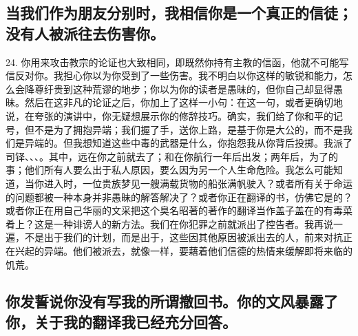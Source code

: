 \subsection{当我们作为朋友分别时，我相信你是一个真正的信徒；没有人被派往去伤害你。}

24. 你用来攻击教宗的论证也大致相同，即既然你持有主教的信函，他就不可能写信反对你。我担心你以为你受到了一些伤害。我不明白以你这样的敏锐和能力，怎么会降尊纡贵到这种荒谬的地步；你以为你的读者是愚昧的，但你自己却显得愚昧。然后在这非凡的论证之后，你加上了这样一小句：在这一句，或者更确切地说，在夸张的演讲中，你无疑想展示你的修辞技巧。确实，我们给了你和平的记号，但不是为了拥抱异端；我们握了手，送你上路，是基于你是大公的，而不是我们是异端的。但我想知道这些中毒的武器是什么，你抱怨我从你背后投掷。我派了司铎、、、。其中，远在你之前就去了；和在你航行一年后出发；两年后，为了的事；他们所有人要么出于私人原因，要么因为另一个人生命危险。我怎么可能知道，当你进入时，一位贵族梦见一艘满载货物的船张满帆驶入？或者所有关于命运的问题都被一种本身并非愚昧的解答解决了？或者你正在翻译的书，仿佛它是的？或者你正在用自己华丽的文采把这个臭名昭著的著作的翻译当作盖子盖在的有毒菜肴上？这是一种诽谤人的新方法。我们在你犯罪之前就派出了控告者。我再说一遍，不是出于我们的计划，而是出于，这些因其他原因被派出去的人，前来对抗正在兴起的异端。他们被派去，就像一样，要藉着他们信德的热情来缓解即将来临的饥荒。\par


\subsection{你发誓说你没有写我的所谓撤回书。你的文风暴露了你，关于我的翻译我已经充分回答。}


